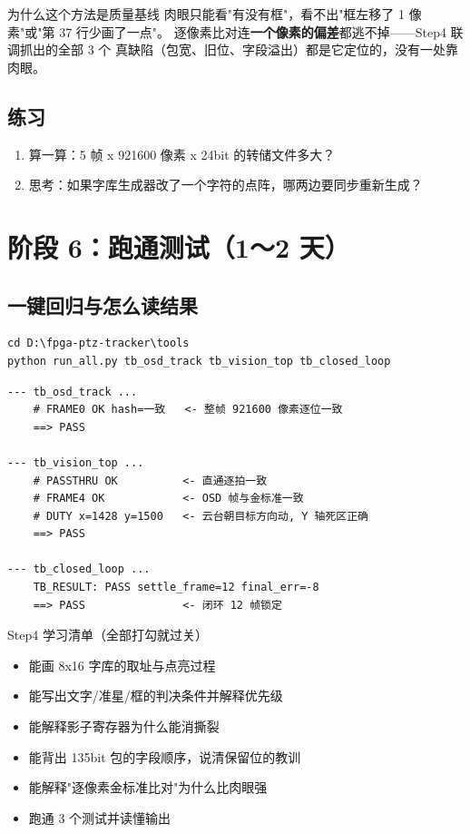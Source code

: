 \documentclass[11pt]{ctexart}
\begin{document}
\begin{keybox}{为什么这个方法是质量基线}
肉眼只能看"有没有框"，看不出"框左移了 1 像素"或"第 37 行少画了一点"。
逐像素比对连\textbf{一个像素的偏差}都逃不掉——Step4 联调抓出的全部 3 个
真缺陷（包宽、旧位、字段溢出）都是它定位的，没有一处靠肉眼。
\end{keybox}

\subsection{练习}

\begin{enumerate}
  \item 算一算：5 帧 x 921600 像素 x 24bit 的转储文件多大？
  \item 思考：如果字库生成器改了一个字符的点阵，哪两边要同步重新生成？
\end{enumerate}

\section{阶段 6：跑通测试（1～2 天）}

\subsection{一键回归与怎么读结果}

\begin{Verbatim}
cd D:\fpga-ptz-tracker\tools
python run_all.py tb_osd_track tb_vision_top tb_closed_loop
\end{Verbatim}

\begin{Verbatim}
--- tb_osd_track ...
    # FRAME0 OK hash=一致   <- 整帧 921600 像素逐位一致
    ==> PASS

--- tb_vision_top ...
    # PASSTHRU OK          <- 直通逐拍一致
    # FRAME4 OK            <- OSD 帧与金标准一致
    # DUTY x=1428 y=1500   <- 云台朝目标方向动, Y 轴死区正确
    ==> PASS

--- tb_closed_loop ...
    TB_RESULT: PASS settle_frame=12 final_err=-8
    ==> PASS               <- 闭环 12 帧锁定
\end{Verbatim}

\begin{okbox}{Step4 学习清单（全部打勾就过关）}
\begin{itemize}
  \item 能画 8x16 字库的取址与点亮过程
  \item 能写出文字/准星/框的判决条件并解释优先级
  \item 能解释影子寄存器为什么能消撕裂
  \item 能背出 135bit 包的字段顺序，说清保留位的教训
  \item 能解释"逐像素金标准比对"为什么比肉眼强
  \item 跑通 3 个测试并读懂输出
\end{itemize}
\end{okbox}
\end{document}
